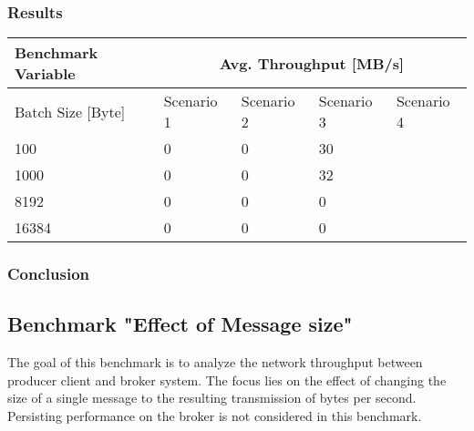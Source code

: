 \subsubsection{Results}
\begin{table}[H]
\centering
\begin{tabular}{|l|l|l|l|l|}
\hline
{\bf Benchmark Variable} & \multicolumn{4}{c|}{{\bf Avg. Throughput {[}MB/s{]}}} \\ \hline
Batch Size [Byte]        & Scenario 1       & Scenario 2       & Scenario 3   & Scenario 4   \\ \hline
100                      & 0                & 0                & 30   &           \\ \hline
1000                     & 0                & 0                & 32   &           \\ \hline
8192                     & 0                & 0                & 0    &           \\ \hline
16384                    & 0                & 0                & 0    &           \\ \hline
\end{tabular}
\end{table}

\subsubsection{Conclusion}


\subsection{Benchmark "Effect of Message size"}
The goal of this benchmark is to analyze the network throughput between
producer client and broker system. The focus lies on the effect of changing the
size of a single message to the resulting transmission of bytes per
second. Persisting performance on the broker is not considered in
this benchmark.

